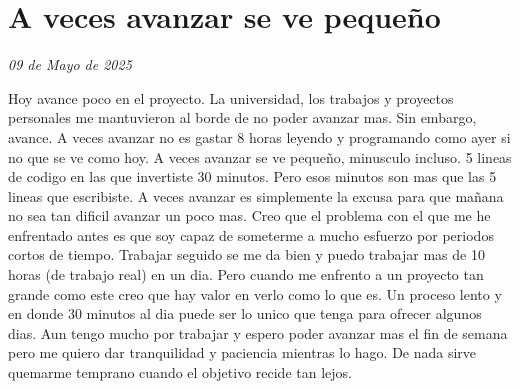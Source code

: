 \section{A veces avanzar se ve pequeño}
\emph{09 de Mayo de 2025}

Hoy avance poco en el proyecto. La universidad, los trabajos y proyectos personales me mantuvieron al borde de no poder avanzar mas. Sin embargo, avance. A veces avanzar no es gastar 8 horas leyendo y programando como ayer si no que se ve como hoy. A veces avanzar se ve pequeño, minusculo incluso. 5 lineas de codigo en las que invertiste 30 minutos. Pero esos minutos son mas que las 5 lineas que escribiste. A veces avanzar es simplemente la excusa para que mañana no sea tan dificil avanzar un poco mas. Creo que el problema con el que me he enfrentado antes es que soy capaz de someterme a mucho esfuerzo por periodos cortos de tiempo. Trabajar seguido se me da bien y puedo trabajar mas de 10 horas (de trabajo real) en un dia. Pero cuando me enfrento a un proyecto tan grande como este creo que hay valor en verlo como lo que es. Un proceso lento y en donde 30 minutos al dia puede ser lo unico que tenga para ofrecer algunos dias. Aun tengo mucho por trabajar y espero poder avanzar mas el fin de semana pero me quiero dar tranquilidad y paciencia mientras lo hago. De nada sirve quemarme temprano cuando el objetivo recide tan lejos.
